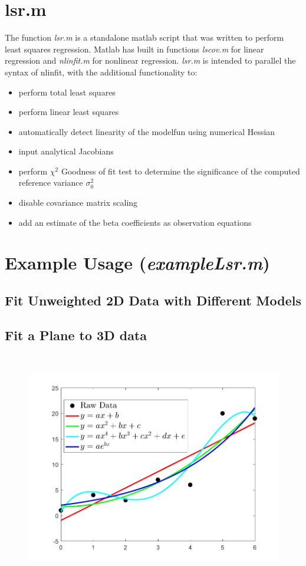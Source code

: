 \documentclass{report}
\begin{document}
\section*{lsr.m}
The function \textit{lsr.m} is a standalone matlab script that was written to perform least squares regression.  Matlab has built in functions \textit{lscov.m} for linear regression and \textit{nlinfit.m} for nonlinear regression. \textit{lsr.m} is intended to parallel the syntax of nlinfit, with the additional functionality to:
\begin{itemize}
	\item perform total least squares
	\item perform linear least squares
	\item automatically detect linearity of the modelfun using numerical Hessian
	\item input analytical Jacobians
	\item perform $\chi^2$ Goodness of fit test to determine the significance of the computed reference variance $\sigma_0^2$
	\item disable covariance matrix scaling
	\item add an estimate of the beta coefficients as observation equations
\end{itemize}
\clearpage
\section*{Example Usage (\textit{exampleLsr.m})}
\subsection*{Fit Unweighted 2D Data with Different Models}

\subsection{Fit a Plane to 3D data}

\begin{figure}[H]
	\centering
	\includegraphics[height = 4in]{basicUsage}
\end{figure}
\end{document}
